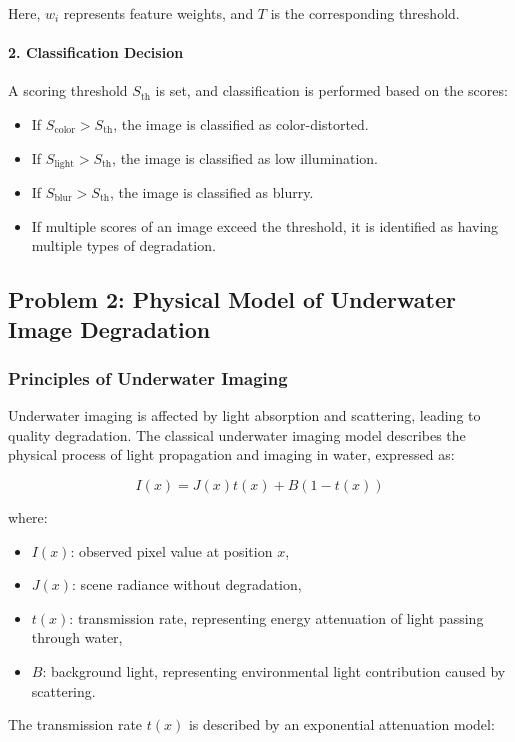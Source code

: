 \documentclass{apmcmthesis}
\begin{document}
Here, $w_i$ represents feature weights, and $T$ is the corresponding threshold.

\paragraph{2. Classification Decision}  
A scoring threshold $S_{\text{th}}$ is set, and classification is performed based on the scores:
\begin{itemize}
    \item If $S_{\text{color}} > S_{\text{th}}$, the image is classified as color-distorted.
    \item If $S_{\text{light}} > S_{\text{th}}$, the image is classified as low illumination.
    \item If $S_{\text{blur}} > S_{\text{th}}$, the image is classified as blurry.
    \item If multiple scores of an image exceed the threshold, it is identified as having multiple types of degradation.
\end{itemize}

\subsection{Problem 2: Physical Model of Underwater Image Degradation}
\subsubsection{Principles of Underwater Imaging}
Underwater imaging is affected by light absorption and scattering, leading to quality degradation. The classical underwater imaging model describes the physical process of light propagation and imaging in water, expressed as:

\[
I(x) = J(x) t(x) + B \left( 1 - t(x) \right)
\]

where:
\begin{itemize}
    \item $I(x)$: observed pixel value at position $x$,
    \item $J(x)$: scene radiance without degradation,
    \item $t(x)$: transmission rate, representing energy attenuation of light passing through water,
    \item $B$: background light, representing environmental light contribution caused by scattering.
\end{itemize}

The transmission rate $t(x)$ is described by an exponential attenuation model:
\end{document}
